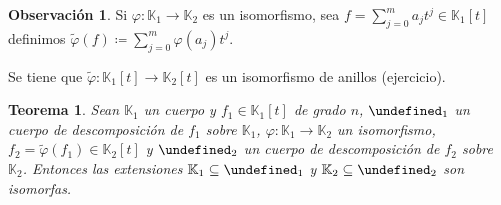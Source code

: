 \documentclass[10pt, spanish]{report}
\newtheorem*{tma}{Teorema}
\theoremstyle{definition}
\newtheorem*{obs}{Observación}
\newcommand{\K}{\mathbb{K}}
\let\L\undefined
\newcommand{\L}{\mathbb{L}}
\begin{document}
\begin{obs}
    Si $\varphi:\K_1 \to \K_2$ es un isomorfismo, sea $f=\sum_{j=0}^ma_jt^j\in
    \K_1[t]$ definimos $\tilde{\varphi}(f)\coloneqq\sum_{j=0}^m\varphi(a_j)t^j$.

    Se tiene que $\tilde{\varphi}:\K_1[t]\to \K_2[t]$ es un isomorfismo de
    anillos (ejercicio).
\end{obs}

\begin{tma}
    Sean $\K_1$ un cuerpo y $f_1\in\K_1[t]$ de grado $n$, $\L_1$ un cuerpo de
    descomposición de $f_1$ sobre $\K_1$, $\varphi:\K_1\to\K_2$ un isomorfismo,
    $f_2=\tilde{\varphi}(f_1)\in\K_2[t]$ y $\L_2$ un cuerpo de descomposición de
    $f_2$ sobre $\K_2$. Entonces las extensiones $\K_1\subseteq\L_1$ y
    $\K_2\subseteq\L_2$ son isomorfas.
\end{tma}
\end{document}
